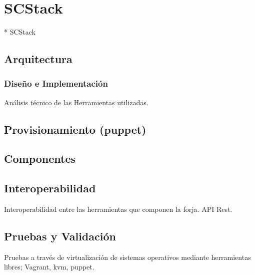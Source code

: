 \chapter{SCStack}
\label{chap:scstack}

* SCStack

\section{Arquitectura}
\label{sec:arquitectura}

\subsection{Diseño e Implementación}
\label{sub:disenyo-implementacion}

\par An\'alisis t\'ecnico de las Herramientas utilizadas.



\section{Provisionamiento (puppet)}
\label{sec:puppet}


\section{Componentes}
\label{sec:componentes}


\section{Interoperabilidad}
\label{sec:interoperabilidad}

\par Interoperabilidad entre las herramientas que componen la forja. API Rest.


\section{Pruebas y Validación}
\label{sec:pruebas-validacion}

\par Pruebas a trav\'es de virtualizaci\'on de sistemas operativos mediante herramientas libres; Vagrant, kvm, puppet.

